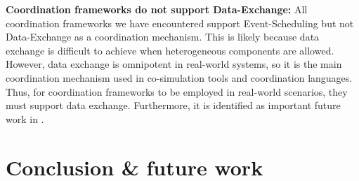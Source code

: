 \documentclass[runningheads]{llncs}
\begin{document}







\textbf{Coordination frameworks do not support Data-Exchange:} All coordination frameworks we have encountered support \textsf{Event-Scheduling} but not \textsf{Data-Exchange} as a coordination mechanism.
This is likely because data exchange is difficult to achieve when heterogeneous components are allowed.
However, data exchange is omnipotent in real-world systems, so it is the main coordination mechanism used in co-simulation tools and coordination languages.
Thus, for coordination frameworks to be employed in real-world scenarios, they must support data exchange.
Furthermore, it is identified as important future work in \cite{krauterBehavioralConsistencyMultimodeling2023,varalarsenBCOolBehavioralCoordination2016}.

\section{Conclusion \& future work} \label{sec:conclusion}



\end{document}
